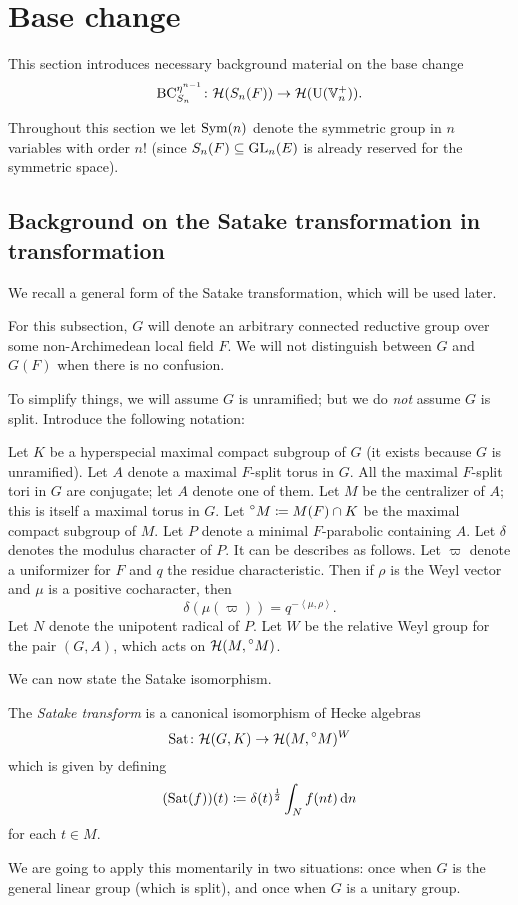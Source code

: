 \section{Base change}
\label{ch:satake}

This section introduces necessary background material on the base change
\[ \operatorname{BC}_{S_n}^{\eta^{n-1}} \colon \mathcal H(S_n(F)) \to \mathcal H(\operatorname{U}(\mathbb V_n^+)). \]

Throughout this section we let $\operatorname{Sym}(n)$ denote the symmetric group in $n$ variables
with order $n!$
(since $S_n(F) \subseteq \operatorname{GL}_n(E)$ is already reserved for the symmetric space).

\subsection{Background on the Satake transformation in transformation}
We recall a general form of the Satake transformation, which will be used later.

For this subsection, $G$ will denote an arbitrary connected reductive group
over some non-Archimedean local field $F$.
We will not distinguish between $G$ and $G(F)$ when there is no confusion.

To simplify things, we will assume $G$ is unramified;
but we do \emph{not} assume $G$ is split.
Introduce the following notation:
\begin{itemize}
  \ii Let $K$ be a hyperspecial maximal compact subgroup of $G$
  (it exists because $G$ is unramified).
  \ii Let $A$ denote a maximal $F$-split torus in $G$.
  All the maximal $F$-split tori in $G$ are conjugate; let $A$ denote one of them.
  \ii Let $M$ be the centralizer of $A$; this is itself a maximal torus in $G$.
  \ii Let $\prescript{\circ}{} M \coloneqq M(F) \cap K$
  be the maximal compact subgroup of $M$.
  \ii Let $P$ denote a minimal $F$-parabolic containing $A$.
  \ii Let $\delta$ denotes the modulus character of $P$.
  It can be describes as follows.
  Let $\varpi$ denote a uniformizer for $F$ and $q$ the residue characteristic.
  Then if $\rho$ is the Weyl vector and $\mu$ is a positive cocharacter, then
  \[ \delta(\mu(\varpi)) = q^{- \left< \mu, \rho\right>}. \]
  \ii Let $N$ denote the unipotent radical of $P$.
  \ii Let $W$ be the relative Weyl group for the pair $(G,A)$,
  which acts on $\mathcal H(M, \prescript{\circ}{} M)$.
\end{itemize}
We can now state the Satake isomorphism.
\begin{definition}
  The \emph{Satake transform} is a canonical isomorphism of Hecke algebras
  \[ \operatorname{Sat} \colon \mathcal H(G, K) \to \mathcal H(M, \prescript{\circ}{} M)^W \]
  which is given by defining
  \[ (\Sat(f))(t) \coloneqq \delta(t)^\half \int_N f(nt) \odif n  \]
  for each $t \in M$.
\end{definition}
We are going to apply this momentarily in two situations:
once when $G$ is the general linear group (which is split),
and once when $G$ is a unitary group.



